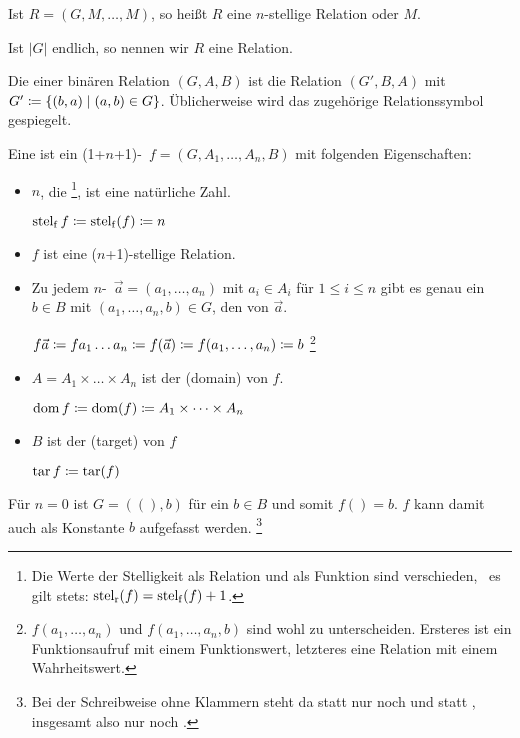 \begin{description}
	Ist $R=(G,M,\dots,M)$, so heißt $R$ eine $n$-stellige Relation  oder  $M$.

	Ist $|G|$ endlich, so nennen wir $R$ eine  Relation.

	\item [\Umkehrrelation] Die  einer binären Relation $(G,A,B)$ ist die Relation $(G',B,A)$ mit $G' \coloneqq \{(b,a)\mid(a,b) \in G\}$.
	Üblicherweise wird das zugehörige Relationssymbol gespiegelt.

	\item [\Funktion] Eine  ist ein (1+$n$+1)-\Tupel\ $f = (G,A_1,\dots,A_n,B)$ mit folgenden Eigenschaften:
	\begin{itemize}
		\item $n$, die %
		\footnote{%
			Die Werte der Stelligkeit als Relation und als Funktion sind verschieden, \textdh\ es gilt stets: $\operatorname*{stel_r}(f) = \operatorname*{stel_f}(f) + 1$.
		},
		ist eine natürliche Zahl.

		$\operatorname*{stel_f} f \coloneqq \operatorname*{stel_f}(f) \coloneqq n$

		\item $f$ ist eine ($n$+1)-stellige Relation.

		\item Zu jedem $n$-\Tupel\ $\vec{a} = (a_1,\dots,a_n)$ mit $a_i \in A_i$ für $1 \le i \le n$ gibt es genau ein $b \in B$ mit $(a_1,\dots,a_n,b) \in G$, den  von $\vec{a}$.

		$f\vec{a} \coloneqq f a_1 \dots a_n \coloneqq f(\vec{a}) \coloneqq f(a_1,\dots,a_n) \coloneqq b$
		\footnote{%
			$f(a_1,\dots,a_n)$ und $f(a_1,\dots,a_n,b)$ sind wohl zu unterscheiden.
			Ersteres ist ein Funktionsaufruf mit einem Funktionswert, letzteres eine Relation mit einem Wahrheitswert.
		}

		\item $A = A_1 \times \dots \times A_n$ ist der  (domain) von $f$.

		$\operatorname*{dom} f \coloneqq \operatorname*{dom}(f) \coloneqq A_1 \times \dots \times A_n$

		\item $B$ ist der  (target) von $f$

		$\operatorname*{tar} f \coloneqq \operatorname*{tar}(f)$
	\end{itemize}
	Für $n = 0$ ist $G = ((),b)$ für ein $b \in B$ und somit $f() = b$. $f$ kann damit auch als Konstante $b$ aufgefasst werden.%
	\footnote{%
		Bei der Schreibweise ohne Klammern steht da statt  nur noch  und statt , insgesamt also nur noch .
	}


\end{description}
